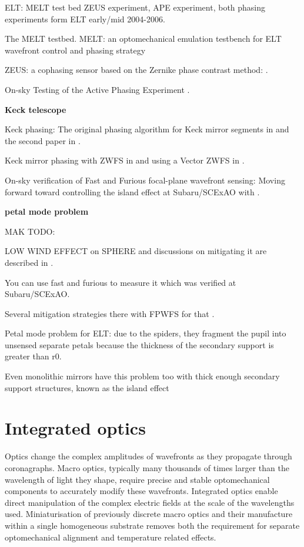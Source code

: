 \documentclass[letterpaper]{ar-1col}
\begin{document}

ELT: MELT test bed ZEUS experiment, APE experiment, both phasing experiments form ELT early/mid 2004-2006.

The MELT testbed. MELT: an optomechanical emulation testbench for ELT wavefront control and phasing strategy \citep{Pfrommer18}

ZEUS: a cophasing sensor based on the Zernike phase contrast method: \citep{Dohlen06}.

On-sky Testing of the Active Phasing Experiment  \citet{Gonte09}.

{\bf Keck telescope}

Keck phasing: The original phasing algorithm for Keck mirror segments in \citet{Chanan98} and the second paper in \citet{Chanan00}.

Keck mirror phasing with ZWFS in \citet{vanKooten22} and using a Vector ZWFS in \citet{Salama24}.

On-sky verification of Fast and Furious focal-plane wavefront sensing: Moving forward toward controlling the island effect at Subaru/SCExAO with \citet{Bos20}.

{\bf petal mode problem}

MAK TODO:

LOW WIND EFFECT on SPHERE \citep{Sauvage16} and discussions on mitigating it are described in \citet{Milli18}.

You can use fast and furious to measure it \citep{Wilby18} which was verified at Subaru/SCExAO.

Several mitigation strategies there with FPWFS for that \citep{Vievard19}.

Petal mode problem for ELT: due to the spiders, they fragment the pupil into unsensed separate petals because the thickness of the secondary support is greater than r0.

Even monolithic mirrors have this problem too with thick enough secondary support structures, known as the island effect \citep{Leboulleux22,Leboulleux22a}

\section{Integrated optics}

Optics change the complex amplitudes of wavefronts as they propagate through coronagraphs.
%
Macro optics, typically many thousands of times larger than the wavelength of light they shape, require precise and stable optomechanical components to accurately modify these wavefronts.
%
Integrated optics enable direct manipulation of the complex electric fields at the scale of the wavelengths used.
%
Miniaturisation of previously discrete macro optics and their manufacture within a single homogeneous substrate removes both the requirement for separate optomechanical alignment and temperature related effects.
%
\end{document}
